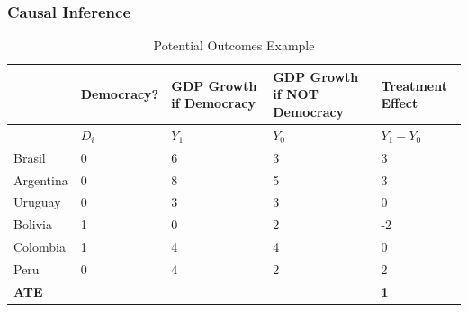 \documentclass[xcolor=x11names,compress]{beamer}\usepackage[]{graphicx}\usepackage[]{color}
\renewcommand{\(}{\begin{columns}}
\renewcommand{\)}{\end{columns}}
\newcommand{\<}[1]{\begin{column}{#1}}
\renewcommand{\>}{\end{column}}
\begin{document}
\begin{frame}
\frametitle{Causal Inference}
\scriptsize
\begin{table}[htbp]
  \centering
  \caption{Potential Outcomes Example}
    \begin{tabular}{|p{1.8cm}|p{1.8cm}|p{2cm}|p{2cm}|p{2cm}|}
    \hline
          & \multicolumn{1}{p{1.8cm}|}{Democracy?} & \multicolumn{1}{p{2cm}|}{GDP Growth if Democracy} & \multicolumn{1}{p{2.2cm}|}{GDP Growth if NOT Democracy} & \textbf{Treatment Effect} \bigstrut\\
    \hline
          & \multicolumn{1}{p{1.8cm}|}{$D_i$} & \multicolumn{1}{p{2cm}|}{$Y_1$} & \multicolumn{1}{p{2.2cm}|}{$Y_0$} & \multicolumn{1}{p{1.8cm}|}{$Y_{1} - Y_{0}$} \bigstrut\\
    \hline
    Brasil & 0 & 6     & 3     & 3 \bigstrut\\
    \hline
    Argentina & 0 & 8    & 5     & 3 \bigstrut\\
    \hline
    Uruguay & 0 & 3 & 3 & 0  \bigstrut\\
    \hline
    Bolivia & 1 & 0     & 2     & -2 \bigstrut\\
    \hline
    Colombia & 1 & 4    & 4    & 0 \bigstrut\\
    \hline
    Peru & 0 & 4     & 2     & 2 \bigstrut\\
    \hline
    \textbf{ATE} & & & & \textbf{1} \bigstrut\\
    \hline
    \end{tabular}%
  \label{tab:addlabel}%
\end{table}%
\normalsize
\end{frame}
\end{document}
